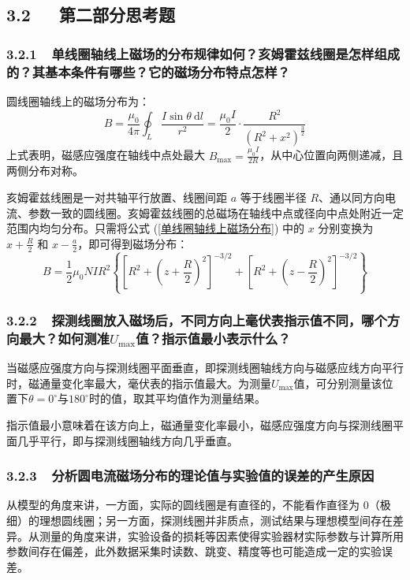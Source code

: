 \documentclass[UTF8]{article}
\theoremstyle{MyLineTheoremStyle} %
\theoremstyle{MyBlockTheoremStyle} %
\theoremstyle{MySubsubsectionStyle} %
\begin{document}
\subsection*{3.2\ \ \ 第二部分思考题}
\subsubsection*{3.2.1\ \ 单线圈轴线上磁场的分布规律如何？亥姆霍兹线圈是怎样组成的？其基本条件有哪些？它的磁场分布特点怎样？}
圆线圈轴线上的磁场分布为：
\begin{equation}\label{单线圈轴线上磁场分布}
B = \frac{\mu_0}{4 \pi} \oint_L \frac{I\sin \theta \ \mathrm{d} l}{r^2} = \frac{\mu_0 I}{2}\cdot \frac{R^2}{\left( R^2 + x^2 \right)^{\frac{3}{2}}}
\end{equation}
上式表明，磁感应强度在轴线中点处最大 $B_{\max} = \frac{\mu_0 I}{2 R}$，从中心位置向两侧递减，且两侧分布对称。

亥姆霍兹线圈是一对共轴平行放置、线圈间距 $a$ 等于线圈半径 $R$、通以同方向电流、参数一致的圆线圈。亥姆霍兹线圈的总磁场在轴线中点或径向中点处附近一定范围内均匀分布。只需将公式 (\ref{单线圈轴线上磁场分布}) 中的 $x$ 分别变换为 $x + \frac{R}{2}$ 和 $x - \frac{a}{2}$，即可得到磁场分布：
\begin{equation}
    B=\frac12\mu_0NIR^2\left\{\left[R^2+\left(z + \frac R2\right)^2\right]^{-3/2}+\left[R^2+\left(z - \frac R2\right)^2\right]^{-3/2}\right\} 
\end{equation}

\subsubsection*{3.2.2\ \ 探测线圈放入磁场后，不同方向上毫伏表指示值不同，哪个方向最大？如何测准$ U_{\max} $值？指示值最小表示什么？}
当磁感应强度方向与探测线圈平面垂直，即探测线圈轴线方向与磁感应线方向平行时，磁通量变化率最大，毫伏表的指示值最大。为测量$ U_{\max} $值，可分别测量该位置下$ \theta=0^\circ $与$ 180^\circ $时的值，取其平均值作为测量结果。

指示值最小意味着在该方向上，磁通量变化率最小，磁感应强度方向与探测线圈平面几乎平行，即与探测线圈轴线方向几乎垂直。

\subsubsection*{3.2.3\ \ 分析圆电流磁场分布的理论值与实验值的误差的产生原因}
从模型的角度来讲，一方面，实际的圆线圈是有直径的，不能看作直径为 0（极细）的理想圆线圈；另一方面，探测线圈并非质点，测试结果与理想模型间存在差异。从测量的角度来讲，实验设备的损耗等因素使得实验器材实际参数与计算所用参数间存在偏差，此外数据采集时读数、跳变、精度等也可能造成一定的实验误差。
\end{document}
